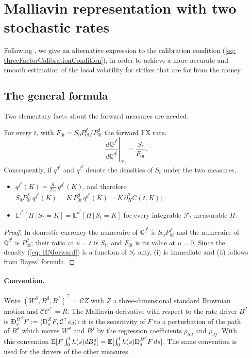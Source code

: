 \section{Malliavin representation with two stochastic rates}\label{subsec: malliavin3F}
Following \cite{guyonLabordere}, we give an alternative expression to the calibration condition (\ref{eq: threeFactorCalibrationCondition}), in order to achieve a more accurate and smooth estimation of the local volatility for strikes that are far from the money.

\subsection{The general formula}
Two elementary facts about the forward measures are needed.
\begin{lem}\label{lem: forwardMeasures}
For every $t$, with $F_{0t}=S_0P^f_{0t}/P^d_{0t}$ the forward FX rate,
\begin{equation}\label{eq: RNforward}
\left.\frac{d\mathbb{Q}^{f^t}}{d\mathbb{Q}^{d^t}}\right|_{\mathcal{F}_t}=\frac{S_t}{F_{0t}} .
\end{equation}
Consequently, if $q^{d^t}$ and $q^{f^t}$ denote the densities of $S_t$ under the two measures,
\begin{itemize}
\item[(i)] $q^{f^t}(K)=\frac{K}{F_{0t}}\,q^{d^t}(K)$, and therefore $S_0P^f_{0t}\,q^{f^t}(K)=K\,P^d_{0t}\,q^{d^t}(K)=K\,\partial_K^2C(t,K)$;
\item[(ii)] $\mathbb{E}^{f^t}[H\,|\,S_t=K]=\mathbb{E}^{d^t}[H\,|\,S_t=K]$ for every integrable $\mathcal{F}_t$-measurable $H$.
\end{itemize}
\end{lem}
\begin{proof}
In domestic currency the numeraire of $\mathbb{Q}^{f^t}$ is $S_uP^f_{ut}$ and the numeraire of $\mathbb{Q}^{d^t}$ is $P^d_{ut}$; their ratio at $u=t$ is $S_t$, and $F_{0t}$ is its value at $u=0$. Since the density (\ref{eq: RNforward}) is a function of $S_t$ only, (i) is immediate and (ii) follows from Bayes' formula.
\end{proof}

\paragraph{Convention.} Write $(W^S,B^d,B^f)^\top=\mathcal{C}Z$ with $Z$ a three-dimensional standard Brownian motion and $\mathcal{C}\mathcal{C}^\top=R$. The Malliavin derivative with respect to the rate driver $B^d$ is $\MD^{B^d}_sF:=\langle \MD^Z_sF,\mathcal{C}^\top e_d\rangle$: it is the sensitivity of $F$ to a perturbation of the path of $B^d$ which moves $W^S$ and $B^f$ by the regression coefficients $\rho_{Sd}$ and $\rho_{df}$. With this convention $\mathbb{E}[F\int_0^th(s)dB^d_s]=\mathbb{E}[\int_0^th(s)\MD^{B^d}_sF\,ds]$. The same convention is used for the drivers of the other measures.

